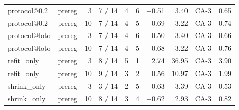 \begin{tabular}{llrrrrrrlr}
protocol@0.2 & prereg & 3 & 7 / 14 & 4 & 6 & $-$0.51 & 3.40 & CA-3 & 0.65 \\
protocol@0.2 & prereg & 10 & 7 / 14 & 4 & 5 & $-$0.69 & 3.22 & CA-3 & 0.74 \\
protocol@loto & prereg & 3 & 7 / 14 & 4 & 6 & $-$0.50 & 3.40 & CA-3 & 0.66 \\
protocol@loto & prereg & 10 & 7 / 14 & 4 & 5 & $-$0.68 & 3.22 & CA-3 & 0.76 \\
refit\_only & prereg & 3 & 8 / 14 & 5 & 1 & 2.74 & 36.95 & CA-3 & 3.90 \\
refit\_only & prereg & 10 & 9 / 14 & 3 & 2 & 0.56 & 10.97 & CA-3 & 1.99 \\
shrink\_only & prereg & 3 & 3 / 14 & 2 & 5 & $-$0.63 & 3.39 & CA-3 & 0.53 \\
shrink\_only & prereg & 10 & 8 / 14 & 3 & 4 & $-$0.62 & 2.93 & CA-3 & 0.82 \\
\bottomrule
\end{tabular}
